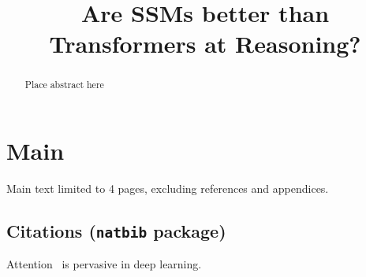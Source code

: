 \documentclass[anon]{ngsm2024} %
\title[Are SSMs better than Transformers?]{Are SSMs better than Transformers at Reasoning?}
\begin{document}
\maketitle

\begin{abstract}%
Place abstract here
\end{abstract}


\section{Main}
Main text limited to 4 pages, excluding references and appendices.

\subsection{Citations (\texttt{natbib} package)}
Attention~\citep{vaswani2017attention} is pervasive in deep learning.






%
\end{document}
